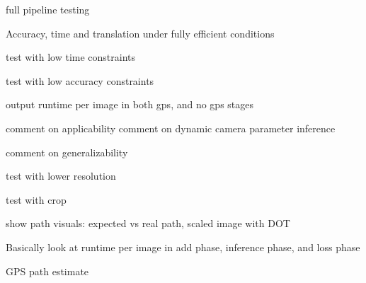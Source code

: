 full pipeline testing 

Accuracy, time and translation under fully efficient conditions

test with low time constraints

test with low accuracy constraints

output runtime per image in both gps, and no gps stages



comment on applicability
comment on dynamic camera parameter inference

comment on generalizability




test with lower resolution 

test with crop

show path visuals: expected vs real path, scaled image with DOT 




Basically look at runtime per image in add phase, inference phase, and loss phase

GPS path estimate